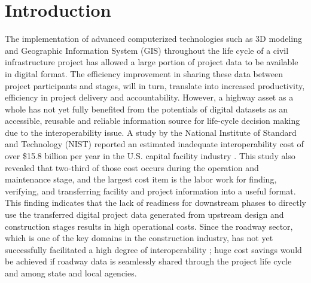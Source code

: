 \documentclass[Journal, BackFigs, DoubleSpace]{ascelike}%
\begin{document}
\section{Introduction}%
The implementation of advanced computerized technologies such as 3D modeling and Geographic Information System (GIS) throughout the life cycle of a civil infrastructure project has allowed a large portion of project data to be available in digital format. The efficiency improvement in sharing these data between project participants and stages, will in turn, translate into increased productivity, efficiency in project delivery and accountability. However, a highway asset as a whole has not yet fully benefited from the potentials of digital datasets as an accessible, reusable and reliable information source for life-cycle decision making due to the interoperability issue. A study by the National Institute of Standard and Technology (NIST) reported an estimated inadequate interoperability cost of over \$15.8 billion per year in the U.S. capital facility industry \cite{Gallaher04}. This study also revealed that two-third of those cost occurs during the operation and maintenance stage, and the largest cost item is the labor work for finding, verifying, and transferring facility and project information into a useful format. This finding indicates that the lack of readiness for downstream phases to directly use the transferred digital project data generated from upstream design and construction stages results in high operational costs. Since the roadway sector, which is one of the key domains in the construction industry, has not yet successfully facilitated a high degree of interoperability \cite{lefler14}; huge cost savings would be achieved if roadway data is seamlessly shared through the project life cycle and among state and local agencies.
\par
\end{document}
